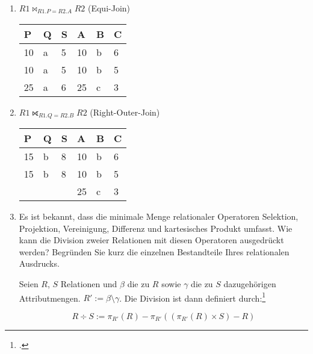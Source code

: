 \documentclass{lehramt-informatik-aufgabe}
\begin{document}
\begin{enumerate}


\item $R1 \bowtie_{R1.P=R2.A} R2$ (Equi-Join)

\begin{liAntwort}
\begin{tabular}{llllll}
P  & Q & S & A & B  & C \\\hline\hline
10 & a & 5 & 10 & b & 6 \\\hline
10 & a & 5 & 10 & b & 5 \\\hline
25 & a & 6 & 25 & c & 3 \\\hline
\end{tabular}
\end{liAntwort}


\item $R1 \rightouterjoin_{R1.Q=R2.B} R2$ (Right-Outer-Join)

\begin{liAntwort}
\begin{tabular}{llllll}
P  & Q & S & A  & B & C \\\hline\hline
15 & b & 8 & 10 & b & 6\\\hline
15 & b & 8 & 10 & b & 5\\\hline
   &   &   & 25 & c & 3\\\hline
\end{tabular}
\end{liAntwort}


\item Es ist bekannt, dass die minimale Menge relationaler Operatoren
Selektion, Projektion, Vereinigung, Differenz und kartesisches Produkt
umfasst. Wie kann die Division zweier Relationen mit diesen Operatoren
ausgedrückt werden? Begründen Sie kurz die einzelnen Bestandteile Ihres
relationalen Ausdrucks.

\begin{liAntwort}
Seien $R$, $S$ Relationen und $\beta$ die zu $R$ sowie $\gamma$ die zu
$S$ dazugehörigen Attributmengen. $R':=\beta \setminus \gamma$.
Die Division ist dann definiert durch:\footcite[Division]{wiki:relationale-algebra}

\begin{displaymath}
R\div S :=
\pi_{R'}(R) -
\pi_{R'}((\pi_{R'}(R) \times S) - R)
\end{displaymath}
\end{liAntwort}

\end{enumerate}
\end{document}
